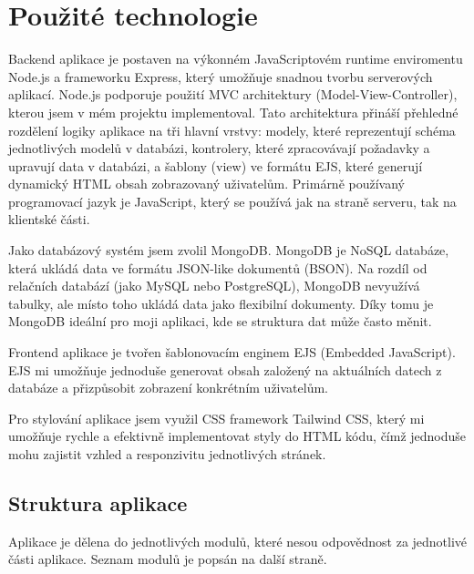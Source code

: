 \section{Použité technologie}
\par Backend aplikace je postaven na výkonném JavaScriptovém runtime enviromentu Node.js a frameworku Express, který umožňuje snadnou tvorbu serverových aplikací. Node.js podporuje použití MVC architektury (Model-View-Controller), kterou jsem v mém projektu implementoval. Tato architektura přináší přehledné rozdělení logiky aplikace na tři hlavní vrstvy: modely, které reprezentují schéma jednotlivých modelů v databázi, kontrolery, které zpracovávají požadavky a upravují data v databázi, a šablony (view) ve formátu EJS,   které generují dynamický HTML obsah zobrazovaný uživatelům. Primárně používaný programovací jazyk je JavaScript, který se používá jak na straně serveru, tak na klientské části.
\par Jako databázový systém jsem zvolil MongoDB. MongoDB je NoSQL databáze, která ukládá data ve formátu JSON-like dokumentů (BSON). Na rozdíl od relačních databází (jako MySQL nebo PostgreSQL), MongoDB nevyužívá tabulky, ale místo toho ukládá data jako flexibilní dokumenty. Díky tomu je MongoDB ideální pro moji aplikaci, kde se struktura dat může často měnit.
\par Frontend aplikace je tvořen šablonovacím enginem EJS (Embedded JavaScript). EJS mi umožňuje jednoduše generovat obsah založený na aktuálních datech z databáze a přizpůsobit zobrazení konkrétním uživatelům.
\par Pro stylování aplikace jsem využil CSS framework Tailwind CSS, který mi umožňuje rychle a efektivně implementovat styly do HTML kódu, čímž jednoduše mohu zajistit vzhled a responzivitu jednotlivých stránek.

\subsection{Struktura aplikace}
\par Aplikace je dělena do jednotlivých modulů, které nesou odpovědnost za jednotlivé části aplikace. Seznam modulů je popsán na další straně.

\newpage

